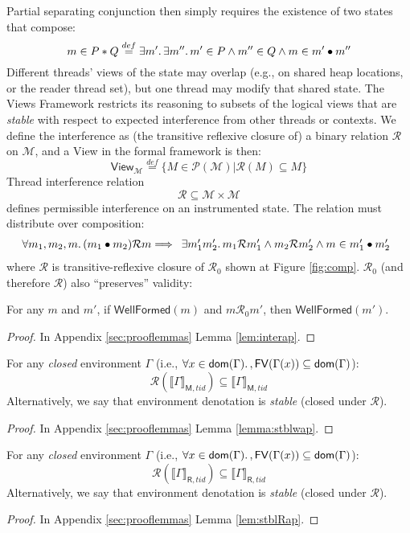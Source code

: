 Partial separating conjunction then simply requires the existence of two states that compose:
\[ m \in P \ast Q   \stackrel{def}{=} \exists m' \ldotp \exists m'' \ldotp m' \in P \land m'' \in Q \land m \in m' \bullet m''\]
Different threads' views of the state may overlap (e.g., on shared heap locations, or the reader thread set), but one thread may modify that shared state.  The Views Framework restricts its reasoning to subsets of the logical views that are \emph{stable} with respect to expected interference from other threads or contexts.  We define the interference as (the transitive reflexive closure of) a binary relation $\mathcal{R}$ on $\mathcal{M}$, and a \textsf{View} in the formal framework is then:
\[\textsf{View}_{\mathcal{M}} \stackrel{def}{=} \{ M \in \mathcal{P}(\mathcal{M}) | \mathcal{R}(M) \subseteq M\}\]
Thread interference relation
\[\mathcal{R} \subseteq \mathcal{M} \times \mathcal{M}\]  defines permissible interference on an instrumented state. The relation must distribute over composition:
\[ \forall m_{1}, m_{2}, m\ldotp (m_{1} \bullet  m_{2})\mathcal{R}m \Longrightarrow \begin{array}{ll}  \exists  m'_{1} m'_{2} \ldotp m_{1} \mathcal{R} m'_{1} \land m_{2} \mathcal{R} m'_{2} \land  m \in m'_{1} \bullet m'_{2} \end{array}\]
where $\mathcal{R}$ is transitive-reflexive closure of $\mathcal{R}_{0}$ shown at Figure \ref{fig:comp}. $\mathcal{R}_0$ (and therefore $\mathcal{R}$) also ``preserves'' validity:
\begin{lemma}\label{lem:inter}
For any $m$ and $m'$, if $\mathsf{WellFormed}(m)$ and $m\mathcal{R}_0m'$, then $\mathsf{WellFormed}(m')$.
\end{lemma}
\begin{proof}
In Appendix \ref{sec:prooflemmas} Lemma \ref{lem:interap}.
\end{proof}
\begin{lemma}\label{lemma:stblw}
For any \emph{closed} environment $\Gamma$ (i.e., $\forall x\in\mathsf{dom}(\Gamma)\ldotp, \mathsf{FV}(\Gamma(x))\subseteq\mathsf{dom}(\Gamma)$):
\[
\mathcal{R}(\llbracket\Gamma\rrbracket_{\mathsf{M},tid})\subseteq\llbracket\Gamma\rrbracket_{\mathsf{M},tid}
\]
Alternatively, we say that environment denotation is \emph{stable} (closed under $\mathcal{R}$).
\end{lemma}
\begin{proof}
In Appendix \ref{sec:prooflemmas} Lemma \ref{lemma:stblwap}.
\end{proof}
\begin{lemma}
For any \emph{closed} environment $\Gamma$ (i.e., $\forall x\in\mathsf{dom}(\Gamma)\ldotp, \mathsf{FV}(\Gamma(x))\subseteq\mathsf{dom}(\Gamma)$):
\[
\mathcal{R}(\llbracket\Gamma\rrbracket_{\mathsf{R},tid})\subseteq\llbracket\Gamma\rrbracket_{\mathsf{R},tid}
\]
Alternatively, we say that environment denotation is \emph{stable} (closed under $\mathcal{R}$).
\end{lemma}
\begin{proof}
In Appendix \ref{sec:prooflemmas} Lemma \ref{lem:stblRap}.
\end{proof}

